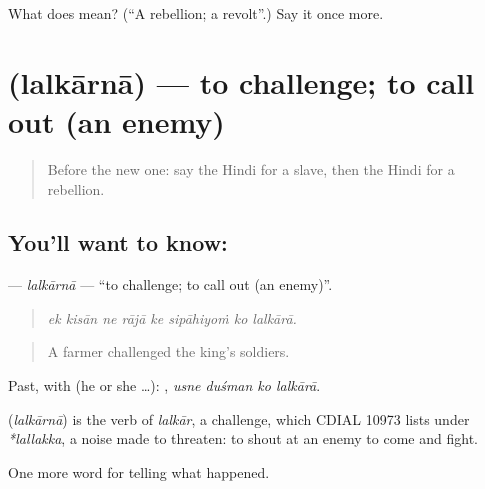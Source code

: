 \begin{tcolorbox}[breakable,colback=teal!4,colframe=teal!35!black,title={Before you move on}]
What does  mean? (\textquotedblleft{}A rebellion; a revolt\textquotedblright{}.) Say it once more.
\end{tcolorbox}
\section[\texorpdfstring{\hi{ललकारना} (lalkārnā)}{ललकारना (lalkārnā)}]{ (lalkārnā) — to challenge; to call out (an enemy)}

\label{lesson:HI-C324-lalkarna}



\begin{quote}
Before the new one: say the Hindi for a slave, then the Hindi for a rebellion.
\end{quote}

\subsection*{You'll want to know: }
\textbf{} — \emph{lalkārnā} — \textquotedblleft{}to challenge; to call out (an enemy)\textquotedblright{}.

\begin{quote}
       
\end{quote}

\begin{quote}
\emph{ek kisān ne rājā ke sipāhiyoṁ ko lalkārā.}
\end{quote}

\begin{quote}
A farmer challenged the king's soldiers.
\end{quote}

Past, with  (he or she …):    , \emph{usne duśman ko lalkārā}.

\begin{cousinweb}
\textbf{} (\emph{lalkārnā}) is the verb of \emph{lalkār}, a challenge, which CDIAL 10973 lists under \emph{*lallakka}, a noise made to threaten: to shout at an enemy to come and fight.
\end{cousinweb}

\begin{grammarlens}[title={What you've built}]
One more word for telling what happened.
\end{grammarlens}

